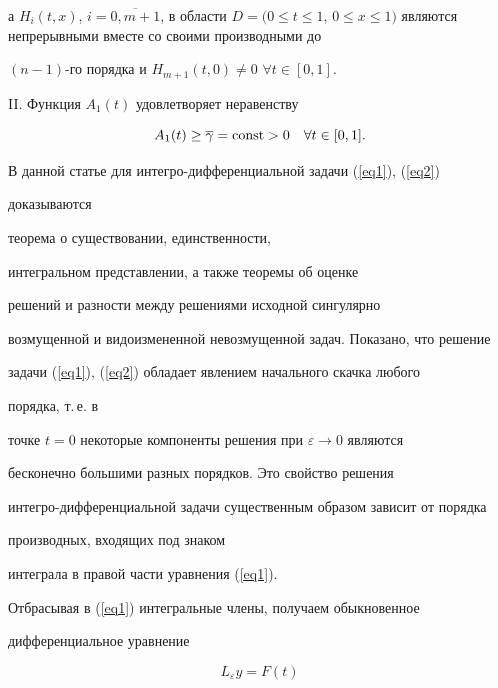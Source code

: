 а $H_{i}(t,x)$, $i=\overline{0,m+1}$, в области $D=(0 \le t \le 1$, $0 \le 


x \le 1)$ являются непрерывными вместе со своими производными до


$(n - 1)$-го порядка и $H_{m+1}(t,0)\ne 0$\; $\forall t \in [0,1].$





II. Функция $A_{1}(t)$ удовлетворяет неравенству


$$


A_{1} (t) \ge \overline {\gamma}  = \const > 0\quad \forall t \in [0,1].


$$





В данной статье для интегро-дифференциальной задачи (\ref{eq1}), (\ref{eq2}) 


доказываются 


теорема о существовании, единственности,


интегральном представлении, а также теоремы об оценке


решений и разности между решениями исходной сингулярно 


возмущенной и видоизмененной невозмущенной задач. Показано, что решение 


задачи (\ref{eq1}), (\ref{eq2}) обладает явлением начального скачка любого 


порядка, т.\,е. в 


точке $t = 0$ некоторые компоненты решения при $\varepsilon \to 0$ являются 


бесконечно большими разных порядков. Это свойство решения 


интегро-дифференциальной задачи существенным образом зависит от порядка 


производных, входящих под знаком 


интеграла в правой части уравнения (\ref{eq1}). 





Отбрасывая в (\ref{eq1}) интегральные члены, получаем обыкновенное 


дифференциальное уравнение


\begin{equation}


\label{eq3}


L_{\varepsilon}y=F(t)


\end{equation}


